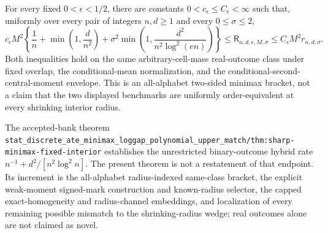 For every fixed \(0<\epsilon<1/2\), there are constants \(0<c_{\epsilon}\le C_{\epsilon}<\infty\) such that, uniformly over every pair of integers \(n,d\ge1\) and every \(0\le\sigma\le2\),
\[
 c_{\epsilon}M^2\left\{\frac1n+\min\left(1,\frac d{n^2}\right)+\sigma^2\min\left(1,\frac{d^2}{n^2\log^2(en)}\right)\right\}
 \le\mathsf R_{n,d,\epsilon,M,\sigma}
 \le C_{\epsilon}M^2r_{n,d,\sigma}.
\]
Both inequalities hold on the same arbitrary-cell-mass real-outcome class under fixed overlap, the conditional-mean normalization, and the conditional-second-central-moment envelope.  This is an all-alphabet two-sided minimax bracket, not a claim that the two displayed benchmarks are uniformly order-equivalent at every shrinking interior radius.

The accepted-bank theorem \texttt{stat\_discrete\_ate\_minimax\_loggap\_polynomial\_upper\_match/thm:sharp-minimax-fixed-interior} establishes the unrestricted binary-outcome hybrid rate \(n^{-1}+d^2/[n^2\log^2 n]\).  The present theorem is not a restatement of that endpoint.  Its increment is the all-alphabet radius-indexed same-class bracket, the explicit weak-moment signed-mark construction and known-radius selector, the capped exact-homogeneity and radius-channel embeddings, and localization of every remaining possible mismatch to the shrinking-radius wedge; real outcomes alone are not claimed as novel.